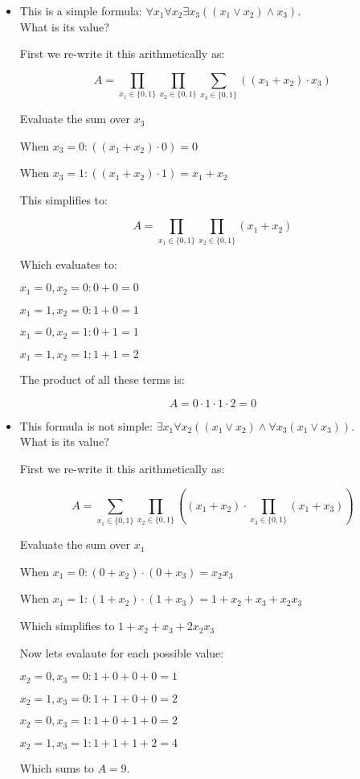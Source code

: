\documentclass{article}
\begin{document}
\begin{itemize}
    \item This is a simple formula: $\forall x_1 \forall x_2 \exists x_3 ((x_1 \vee x_2) \wedge x_3)$.\\
    What is its value?

First we re-write it this arithmetically as:

        $$
        A = \prod_{x_1 \in \{0,1\}} \prod_{x_2 \in \{0,1\}}\sum_{x_3 \in \{0,1\}} ((x_{1} + x_{2}) \cdot x_{3})
        $$

Evaluate the sum over $x_{3}$

        When $x_{3} = 0: ((x_{1} + x_2) \cdot 0) = 0$

        When $x_{3} = 1: ((x_{1} + x_2) \cdot 1) = x_1 + x_2$

This simplifies to:

        $$A = \prod_{x_1 \in \{0,1\}} \prod_{x_2 \in \{0,1\}} (x_1 + x_2)$$

        Which evaluates to:

        $x_{1}=0, x_{2}=0: 0 + 0 =0$

        $x_{1}=1, x_{2}=0: 1 + 0 =1$

        $x_{1}=0, x_{2}=1: 0 + 1 =1$

        $x_{1}=1, x_{2}=1: 1 + 1 =2$

The product of all these terms is:

   $$A = 0 \cdot 1 \cdot 1 \cdot 2 = 0$$

    \item This formula is not simple: $\exists x_1 \forall x_2 ((x_1 \vee x_2) \wedge \forall x_3 (x_1 \vee x_3))$.\\
    What is its value?

First we re-write it this arithmetically as:

        $$
        A = \sum_{x_1 \in \{0,1\}} \prod_{x_2 \in \{0,1\}}((x_{1} + x_{2}) \cdot \prod_{x_3 \in \{0,1\}}(x_{1} + x_{3}))
        $$

Evaluate the sum over $x_{1}$

        When $x_{1} = 0:(0 + x_{2}) \cdot (0 + x_{3})= x_{2}x_{3}$

        When $x_{1} = 1:(1 + x_{2}) \cdot (1 + x_{3})=1 + x_{2} + x_{3} + x_{2}x_{3}$

        Which simplifies to $1 + x_{2} + x_{3} + 2x_{2}x_{3}$

        Now lets evalaute for each possible value:

        $x_{2}=0, x_{3}=0 : 1 + 0 + 0 + 0 = 1$

        $x_{2}=1, x_{3}=0 : 1 + 1 + 0 + 0 = 2$

        $x_{2}=0, x_{3}=1 : 1 + 0 + 1 + 0 = 2$

        $x_{2}=1, x_{3}=1 : 1 + 1 + 1 + 2 = 4$

        Which sums to $A=9$.


\end{itemize}
\end{document}
